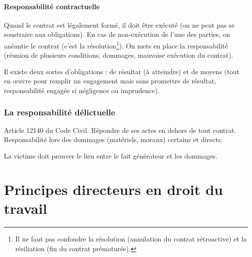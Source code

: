 \documentclass[10pt,a4paper]{article}
\begin{document}
\subsection{Responsabilité contractuelle}

Quand le contrat est légalement formé, il doit être exécuté (on ne peut pas se soustraire aux obligations).
En cas de non-exécution de l'une des parties, on anéantie le contrat (c'est la résolution\footnote{Il ne faut pas confondre la résolution (annulation du contrat rétroactive) et la résiliation (fin du contrat prématurée).}).
On mets en place la responsabilité (réunion de plusieurs conditions, dommages, mauvaise exécution du contrat).

Il existe deux sortes d'obligations : de résultat (à atteindre) et de moyens (tout en œuvre pour remplir un engagement mais sans promettre de résultat, responsabilité engagée si négligence ou imprudence).

\section{La responsabilité délictuelle}

Article 12140 du Code Civil. Répondre de ses actes en dehors de tout contrat. Responsabilité lors des dommages (matériels, moraux) certains et directs.

La victime doit prouver le lien entre le fait générateur et les dommages.

\part{Principes directeurs en droit du travail}
\end{document}
